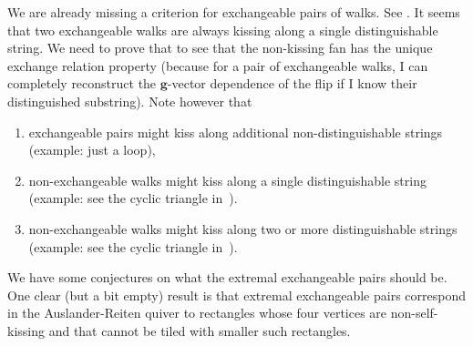 \documentclass{amsart}
\newtheorem{conjecture}[theorem]{Conjecture}
\theoremstyle{definition}
\renewcommand{\b}[1]{{\boldsymbol{#1}}} %
\newcommand{\eqdef}{\mbox{\,\raisebox{0.2ex}{\scriptsize\ensuremath{\mathrm:}}\ensuremath{=}\,}} %
\newcommand{\gvector}[1]{\b{g}(#1)} %
\begin{document}
We are already missing a criterion for exchangeable pairs of walks. See \cite[Sect.~9]{BrustleDouvilleMousavandThomasYildirim}.
It seems that two exchangeable walks are always kissing along a single distinguishable string.
We need to prove that to see that the non-kissing fan has the unique exchange relation property (because for a pair of exchangeable walks, I can completely reconstruct the $\b{g}$-vector dependence of the flip if I know their distinguished substring).
Note however that
\begin{enumerate}
\item exchangeable pairs might kiss along additional non-distinguishable strings (example: just a loop),
\item non-exchangeable walks might kiss along a single distinguishable string (example: see the cyclic triangle in~\cite{PaluPilaudPlamondon-nonkissing}).
\item non-exchangeable walks might kiss along two or more distinguishable strings (example: see the cyclic triangle in~\cite{PaluPilaudPlamondon-nonkissing}).
\end{enumerate}

%

We have some conjectures on what the extremal exchangeable pairs should be.
One clear (but a bit empty) result is that extremal exchangeable pairs correspond in the Auslander-Reiten quiver to rectangles whose four vertices are non-self-kissing and that cannot be tiled with smaller such rectangles.
\end{document}
